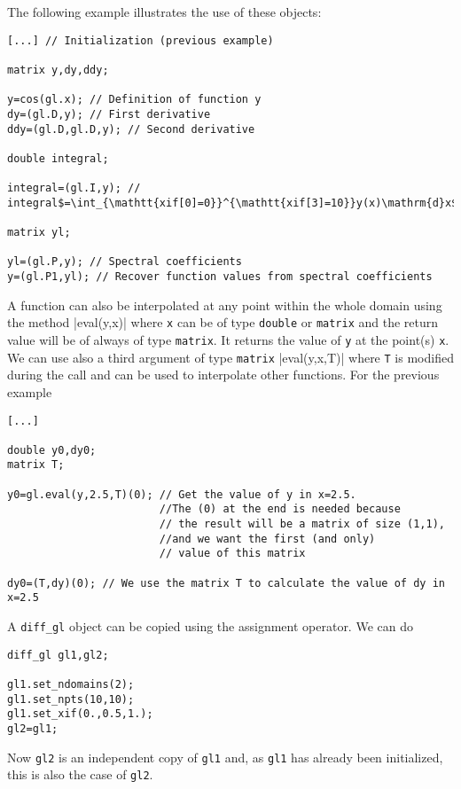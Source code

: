 The following example illustrates the use of these objects:
\begin{verbatim}
[...] // Initialization (previous example)

matrix y,dy,ddy;

y=cos(gl.x); // Definition of function y
dy=(gl.D,y); // First derivative 
ddy=(gl.D,gl.D,y); // Second derivative 

double integral;

integral=(gl.I,y); // integral$=\int_{\mathtt{xif[0]=0}}^{\mathtt{xif[3]=10}}y(x)\mathrm{d}x$

matrix yl;

yl=(gl.P,y); // Spectral coefficients
y=(gl.P1,yl); // Recover function values from spectral coefficients

\end{verbatim}

A function can also be interpolated at any point within the whole domain using the method
|eval(y,x)|
where \texttt{x} can be of type \texttt{double} or \texttt{matrix} and the return value will be 
of always of type \texttt{matrix}. It returns the value of \texttt{y} at the point(s) \texttt{x}.
We can use also a third argument of type \texttt{matrix}
|eval(y,x,T)|
where \texttt{T} is modified during the call and can be used to interpolate other functions. 
For the previous example
\begin{verbatim}
[...]

double y0,dy0;
matrix T;

y0=gl.eval(y,2.5,T)(0); // Get the value of y in x=2.5. 
						//The (0) at the end is needed because
						// the result will be a matrix of size (1,1), 
						//and we want the first (and only)
						// value of this matrix
								
dy0=(T,dy)(0); // We use the matrix T to calculate the value of dy in x=2.5

\end{verbatim}

A {\tt diff\_gl} object can be copied using the assignment operator. We can do
\begin{verbatim}
diff_gl gl1,gl2;

gl1.set_ndomains(2);
gl1.set_npts(10,10);
gl1.set_xif(0.,0.5,1.);
gl2=gl1; 
\end{verbatim}
Now {\tt gl2} is an independent copy of {\tt gl1} and, as {\tt gl1} has already been initialized, this 
is also the case of {\tt gl2}.

